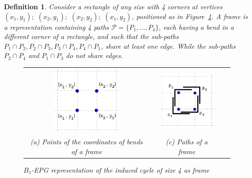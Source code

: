 \documentclass[
submission
]{dmtcs-episciences}
\newtheorem{definition}[theorem]{Definition}
\begin{document}

\begin{definition} \label{defi:tortasFrame2}
 Consider a rectangle of any size with 4 corners at vertices $ (x_1, y_1);$ $(x_2, y_1);$ $(x_2, y_2);$ $(x_1, y_2) $, positioned as in  Figure~\ref{fig:frameInGrid}. A \emph{frame} is a representation containing 4 paths $\mathcal{P} =  \{ P_1, \dots, P_4\} $, each having a bend in a different corner of a rectangle, and such that the  sub-paths $ P_1 \cap P_2, P_2 \cap P_3, P_3 \cap P_4, P_4 \cap P_1 $, share at least one edge. While the sub-paths $ P_2 \cap P_4 $ and $ P_1 \cap P_3 $ do not share edges.

%
\begin{figure}[htb]
  \centering
  \begin{tabular}{c c c c c }
    \includegraphics[width=3.5cm]{dispositionFrameInGrid}    
    & &
 \includegraphics[width=3.5cm]{frameInGrid} \\%
    {\footnotesize (a) Points of the coordinates of bends of a frame}  
    & & {\footnotesize (c) Paths of a frame} %
  \end{tabular}
  \caption{$B_{1}$-EPG representation of the induced cycle of size 4 as frame}\label{fig:frameInGrid}
\end{figure} 
\end{definition}


%
\end{document}
